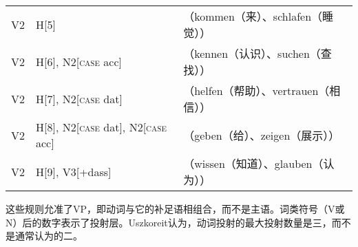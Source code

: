 \ea
\label{gpsg-regeln}
\begin{tabular}[t]{@{}l@{~$\to$~}l@{~~}l@{}}
V2  & H[5]                                    & （kommen（来）、schlafen（睡觉））\\
V2  & H[6], N2[\textsc{case} acc]                &（kennen（认识）、suchen（查找））\\
V2  & H[7], N2[\textsc{case} dat]                &（helfen（帮助）、vertrauen（相信））\\
V2  & H[8], N2[\textsc{case} dat], N2[\textsc{case} acc]  &（geben（给）、zeigen（展示））\\
V2  & H[9], V3[+dass]                         &（wissen（知道）、glauben（认为））\\
\end{tabular}
\z
%
这些规则允准了VP，即动词与它的补足语相组合，而不是主语。词类符号（V或N）后的数字表示了\xbarc 投射层。Uszkoreit认为，动词投射的最大投射数量是三，而不是通常认为的二。

